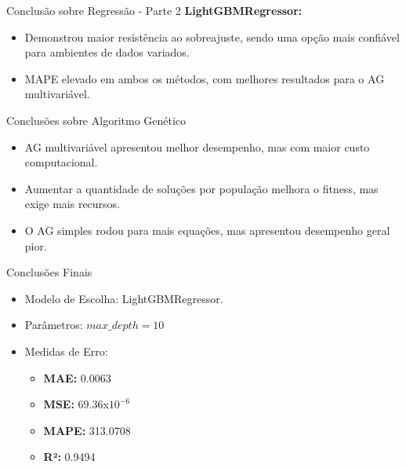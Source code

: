 \documentclass{beamer}
\begin{document}
\begin{frame}{Conclusão sobre Regressão - Parte 2}
    \textbf{LightGBMRegressor:}
    \begin{itemize}
        \item Demonstrou maior resistência ao sobreajuste, sendo uma opção mais confiável para ambientes de dados variados.
    \end{itemize}

    \begin{itemize}
        \item MAPE elevado em ambos os métodos, com melhores resultados para o AG multivariável.
    \end{itemize}

\end{frame}

\begin{frame}{Conclusões sobre Algoritmo Genético}
    \begin{itemize}
        \item AG multivariável apresentou melhor desempenho, mas com maior custo computacional.
        \item Aumentar a quantidade de soluções por população melhora o fitness, mas exige mais recursos.
        \item O AG simples rodou para mais equações, mas apresentou desempenho geral pior.
    \end{itemize}
\end{frame}

\begin{frame}{Conclusões Finais}
    \begin{itemize}
        \item Modelo de Escolha: LightGBMRegressor.
        \item Parâmetros: $max\_depth = 10$
    \end{itemize}
    \begin{itemize}
        \item Medidas de Erro:
              \begin{itemize}    \item \textbf{MAE:} 0.0063
                  \item \textbf{MSE:} $69.36$x$10^{-6}$
                  \item \textbf{MAPE:} 313.0708
                  \item \textbf{R²:} 0.9494
              \end{itemize}
    \end{itemize}
\end{frame}
\end{document}
